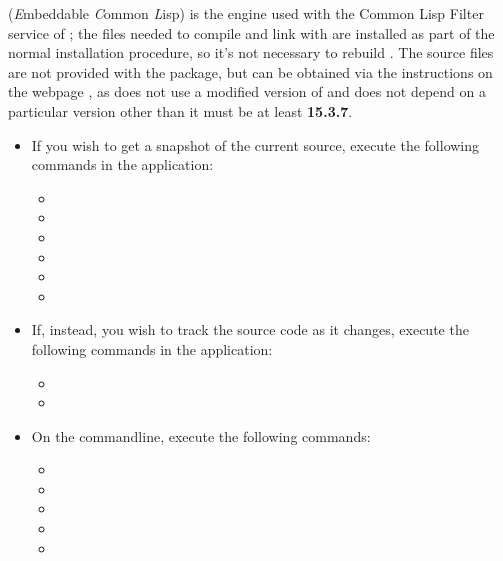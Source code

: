 


\tertiaryEnd
\secondaryEnd
{}
\textbf{\ECL} (\textit{E}mbeddable \textit{C}ommon \textit{L}isp) is the
 engine used with the Common Lisp Filter service of \mplusm{}; the
files needed to compile and link with \textbf{\ECL} are installed as part of the normal
\mplusm{} installation procedure, so it's not necessary to rebuild \textbf{\ECL}.
The source files are not provided with the  package, but can be obtained
via the instructions on the web\longDash{}page
, as
\mplusm{} does not use a modified version of \textbf{\ECL} and does not depend on a
particular version \longDash{} other than it must be at least \textbf{15.3.7}.
\begin{itemize}
\item If you wish to get a snapshot of the current source, execute the following
commands in the  application:
\begin{itemize}
\item {}
\item\exSp{}
\item\exSp{}
\item\exSp{}
\item\exSp{}
\item\exSp{}
\end{itemize}
\item\exSp{}If, instead, you wish to track the source code as it changes, execute the
following commands in the  application:
\begin{itemize}
\item {}
\item\exSp{}
\end{itemize}
\item\exSp{}On the command\longDash{}line, execute the following commands:
\begin{itemize}
\item {}
\item\exSp{}
\item\exSp{}
\item\exSp{}
\item\exSp{}
\end{itemize}
\end{itemize}
